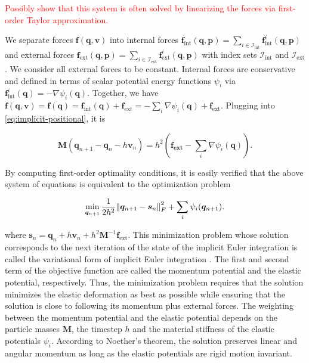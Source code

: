 \textcolor{red}{Possibly show that this system is often solved by linearizing the forces via first-order Taylor approximation.}

We separate forces $\bm{f}(\bm{q}, \bm{v})$ into internal forces $\bm{f}_{\text{int}}(\bm{q}, \bm{p}) = \sum_{i \in \mathcal{I}_{\text{int}}} 
\bm{f}^i_{\text{int}}
(\bm{q}, \bm{p})$ and external forces $\bm{f}_{\text{ext}}(\bm{q}, \bm{p}) = \sum_{i \in \mathcal{I}_{\text{ext}}} \bm{f}^i_{\text{ext}}(\bm{q}, 
\bm{p})$ with index sets $\mathcal{I}_{\text{int}}$ and $\mathcal{I}_{\text{ext}}$. We consider all external forces to be constant. Internal forces 
are conservative and defined in terms of scalar potential energy functions 
$\psi_i$ via $\bm{f}^i_{\text{int}}(\bm{q}) = -\nabla \psi_i(\bm{q})$. Together, we have $\bm{f}(\bm{q}, \bm{v}) = \bm{f} (\bm{q}) 
= \bm{f}_{\text{int}} (\bm{q}) + \bm{f}_{\text{ext}} = -\sum_i \nabla \psi_i(\bm{q}) + \bm{f}_{\text{ext}}$. Plugging into 
\cref{eq:implicit-positional}, it is

\[
    \bm{M}(\bm{q}_{n+1} - \bm{q}_n - h\bm{v}_n) = h^2(\bm{f_\text{ext}} - \sum_i \nabla \psi_i(\bm{q})).
\]

By computing first-order optimality conditions, it is easily verified that the above system of equations is equivalent to the optimization 
problem

\begin{equation}\label{eq:variational-implicit}
    \min_{\bm{q}_{n+1}} \frac{1}{2h^2} \norm{\bm{q}_{n+1} - \bm{s}_n}^2_F + \sum_i \psi_i(\bm{q}_{n+1}).
\end{equation}

\noindent where $\bm{s}_n = \bm{q}_n + h\bm{v}_n + h^2\bm{M}^{-1}\bm{f}_{\text{ext}}$. This minimization problem whose solution corresponds to the next
iteration of the state of the implicit Euler integration is called the variational form of implicit Euler integration \cite{bouaziz2014}. 
The first and second term of the objective function are called the momentum potential and the elastic potential, respectively. Thus, the 
minimization problem requires that the solution minimizes the elastic deformation as best as possible while ensuring that the solution is 
close to following its momentum plus external forces. The weighting between the momentum potential and the elastic potential depends on the 
particle masses $\bm{M}$, the timestep $h$ and the material stiffness of the elastic potentials $\psi_i$. According to Noether's theorem, 
the solution preserves linear and angular momentum as long as the elastic potentials are rigid motion invariant.

